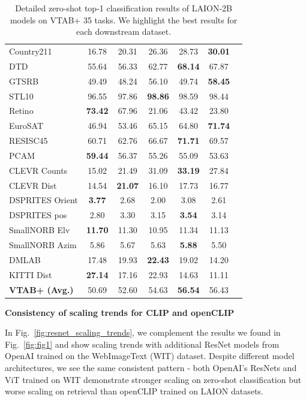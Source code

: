 \begin{appendix}
\begin{table}[ht]
\begin{tabular}{@{}lcccccc@{}}
Country211 & 16.78 &20.31 &26.36 &28.73 &\textbf{30.01 }\\
DTD & 55.64 &56.33 &62.77 &\textbf{68.14 }&67.87 \\
GTSRB & 49.49 &48.24 &56.10 &49.74 &\textbf{58.45 }\\
STL10 & 96.55 &97.86 &\textbf{98.86 }&98.59 &98.44 \\
Retino & \textbf{73.42 }&67.96 &21.06 &43.42 &23.80 \\
EuroSAT & 46.94 &53.46 &65.15 &64.80 &\textbf{71.74 }\\
RESISC45 & 60.71 &62.76 &66.67 &\textbf{71.71 }&69.57 \\
PCAM & \textbf{59.44 }&56.37 &55.26 &55.09 &53.63 \\
CLEVR Counts & 15.02 &21.49 &31.09 &\textbf{33.19 }&27.84 \\
CLEVR Dist & 14.54 &\textbf{21.07 }&16.10 &17.73 &16.77 \\
DSPRITES Orient & \textbf{3.77 }&2.68 &2.00 &3.08 &2.61 \\
DSPRITES pos & 2.80 &3.30 &3.15 &\textbf{3.54 }&3.14 \\
SmallNORB Elv & \textbf{11.70 }&11.30 &10.95 &11.34 &11.13 \\
SmallNORB Azim & 5.86 &5.67 &5.63 &\textbf{5.88 }&5.50 \\
DMLAB & 17.48 &19.93 &\textbf{22.43 }&19.02 &14.20 \\
KITTI Dist & \textbf{27.14 }&17.16 &22.93 &14.63 &11.11 \\

\midrule
\textbf{VTAB+ (Avg.)} & 50.69 &52.60 &54.63 &\textbf{56.54} &56.43 \\
\bottomrule
\end{tabular}
\caption{Detailed zero-shot top-1 classification results of LAION-2B models on VTAB+ 35 tasks. We highlight the best results for each downstream dataset.}
\label{table:vtab_plus_details}
\end{table}

\textbf{Consistency of scaling trends for CLIP and openCLIP}

In Fig.~\ref{fig:resnet_scaling_trends}, we complement the results we found in Fig.~\ref{fig:fig1} and  show scaling trends with additional ResNet models from OpenAI trained on the WebImageText (WIT) dataset. Despite different model architectures, we see the same consistent pattern - both OpenAI’s ResNets and ViT trained on WIT demonstrate stronger scaling on zero-shot classification but worse scaling on retrieval than openCLIP trained on LAION datasets.



\end{appendix}
